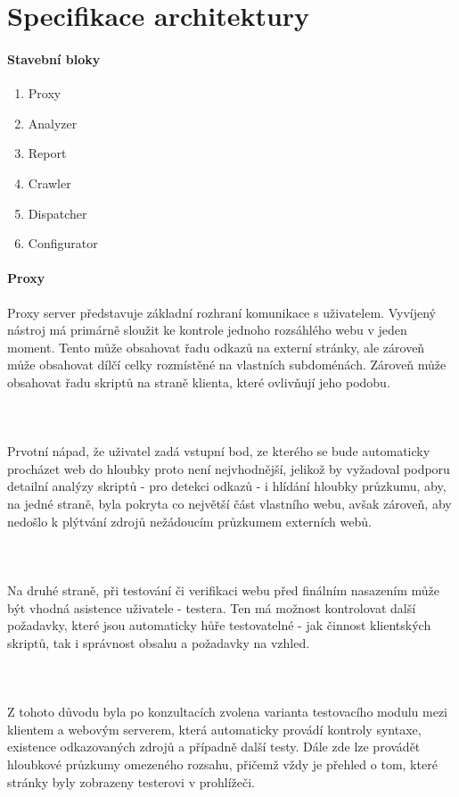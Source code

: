 \documentclass[10pt]{article}
\begin{document}
	\section{Specifikace architektury}
	\paragraph{Stavebn\'i bloky}
	\begin{enumerate}
		\item Proxy
		\item Analyzer
		\item Report
		\item Crawler
		\item Dispatcher
		\item Configurator
	\end{enumerate}
	\paragraph{Proxy} Proxy server představuje základní rozhraní komunikace s uživatelem. Vyvíjený nástroj má primárně sloužit ke kontrole jednoho rozsáhlého webu v jeden moment. Tento může obsahovat řadu odkazů na externí stránky, ale zároveň může obsahovat dílčí celky rozmístěné na vlastních subdoménách. Zároveň může obsahovat řadu skriptů na straně klienta, které ovlivňují jeho podobu.
	\paragraph{~} Prvotní nápad, že uživatel zadá vstupní bod, ze kterého se bude automaticky procházet web do hloubky proto není nejvhodnější, jelikož by vyžadoval podporu detailní analýzy skriptů - pro detekci odkazů - i hlídání hloubky průzkumu, aby, na jedné straně, byla pokryta co největší část vlastního webu, avšak zároveň, aby nedošlo k plýtvání zdrojů nežádoucím průzkumem externích webů.
	\paragraph{~} Na druhé straně, při testování či verifikaci webu před finálním nasazením může být vhodná asistence uživatele - testera. Ten má možnost kontrolovat další požadavky, které jsou automaticky hůře testovatelné - jak činnost klientských skriptů, tak i správnost obsahu a požadavky na vzhled.
	\paragraph{~} Z tohoto důvodu byla po konzultacích zvolena varianta testovacího modulu mezi klientem a webovým serverem, která automaticky provádí kontroly syntaxe, existence odkazovaných zdrojů a případně další testy. Dále zde lze provádět hloubkové průzkumy omezeného rozsahu, přičemž vždy je přehled o tom, které stránky byly zobrazeny testerovi v prohlížeči.
\end{document}
